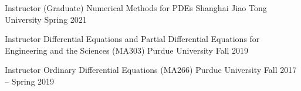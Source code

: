\begin{cventries}
  \cventry
  {Instructor (Graduate)}
  {Numerical Methods for PDEs}
  {Shanghai Jiao Tong University}
  {Spring 2021}
  {}

  \cventry
  {Instructor} %
  {Differential Equations and Partial Differential Equations for
  Engineering and the Sciences (MA303)} %
  {Purdue University} %
  {Fall 2019} %
  {}

  \cventry
  {Instructor} %
  {Ordinary Differential Equations (MA266)} %
  {Purdue University} %
  {Fall 2017 -- Spring 2019} %
  {}

\end{cventries}
